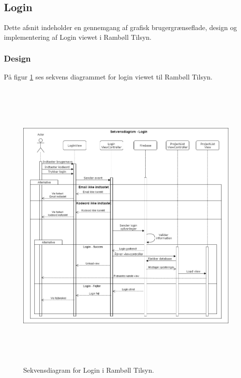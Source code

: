 \subsection{Login} \label{sec:Login}
Dette afsnit indeholder en gennemgang af grafisk brugergrænseflade, design og implementering af Login viewet i Rambøll Tilsyn.

\subsubsection{Design}
På figur \ref{fig:LoginSekvens} ses sekvens diagrammet for login viewet til Rambøll Tilsyn.
\begin{figure}[H] %
	\centering
	\includegraphics[height=15cm, width=15cm]{../ArkitekturDesign/Design/Login/LoginSekvensDiagram}
	\caption{Sekvensdiagram for Login i Rambøll Tilsyn.}
	\label{fig:LoginSekvens}
\end{figure}

\clearpage

